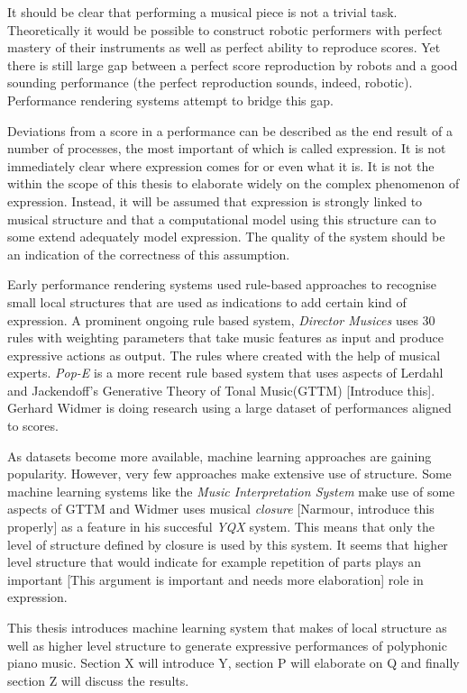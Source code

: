 \documentclass[a4paper,10pt]{article}
\begin{document}
It should be clear that performing a musical piece is not a trivial task. Theoretically it would be possible to construct robotic performers with perfect mastery of their instruments as well as perfect ability to reproduce scores. Yet there is still large gap between a perfect score reproduction by robots and a good sounding performance (the perfect reproduction sounds, indeed, robotic). Performance rendering systems attempt to bridge this gap.

Deviations from a score in a performance can be described as the end result of a number of processes, the most important of which is called expression. It is not immediately clear where expression comes for or even what it is. It is not the within the scope of this thesis to elaborate widely on the complex phenomenon of expression. Instead, it will be assumed that expression is strongly linked to musical structure and that a computational model using this structure can to some extend adequately model expression. The quality of 
the system should be an indication of the correctness of this assumption. 

Early performance rendering systems used rule-based approaches to recognise small local structures that are used as indications to add certain kind of expression. A prominent ongoing rule based system, \textit{Director Musices} uses 30 rules with weighting parameters that take music features as input and produce expressive actions as output. The rules where created with the help of musical experts. \textit{Pop-E} is a more recent rule based system that uses aspects of Lerdahl and Jackendoff's Generative Theory of Tonal Music(GTTM) [Introduce this]. Gerhard Widmer is doing research using a large dataset of performances aligned to scores.

As datasets become more available, machine learning approaches are gaining popularity. However, very few approaches make extensive use of structure. Some machine learning systems like the \textit{Music Interpretation System} make use of some aspects of GTTM and Widmer uses musical \textit{closure} [Narmour, introduce this properly] as a feature in his succesful \textit{YQX} system. This means that only the level of structure defined by closure is used by this system. It seems that higher level structure that would indicate for example repetition of parts plays an important [This argument is important and needs more elaboration] role in expression. 

This thesis introduces machine learning system that makes of local structure as well as higher level structure to generate expressive performances of polyphonic piano music. Section X will introduce Y, section P will elaborate on Q and finally section Z will discuss the results.
\end{document}
